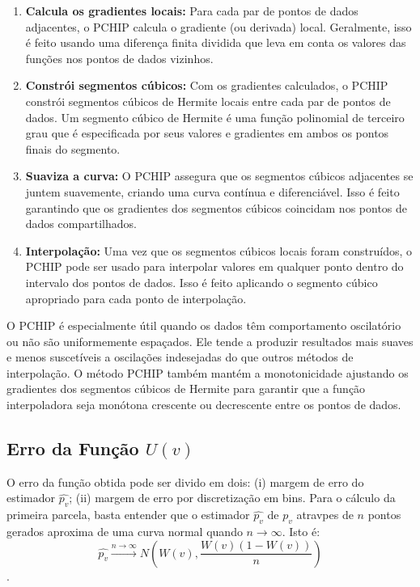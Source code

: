 \documentclass{article}
\begin{document}
\begin{enumerate}
    \item \textbf{Calcula os gradientes locais:} Para cada par de pontos de dados adjacentes, o PCHIP calcula o gradiente (ou derivada) local. Geralmente, isso é feito usando uma diferença finita dividida que leva em conta os valores das funções nos pontos de dados vizinhos.
    
    \item \textbf{Constrói segmentos cúbicos:} Com os gradientes calculados, o PCHIP constrói segmentos cúbicos de Hermite locais entre cada par de pontos de dados. Um segmento cúbico de Hermite é uma função polinomial de terceiro grau que é especificada por seus valores e gradientes em ambos os pontos finais do segmento.
    
    \item \textbf{Suaviza a curva:} O PCHIP assegura que os segmentos cúbicos adjacentes se juntem suavemente, criando uma curva contínua e diferenciável. Isso é feito garantindo que os gradientes dos segmentos cúbicos coincidam nos pontos de dados compartilhados.
    
    \item \textbf{Interpolação:} Uma vez que os segmentos cúbicos locais foram construídos, o PCHIP pode ser usado para interpolar valores em qualquer ponto dentro do intervalo dos pontos de dados. Isso é feito aplicando o segmento cúbico apropriado para cada ponto de interpolação.
\end{enumerate}

O PCHIP é especialmente útil quando os dados têm comportamento oscilatório ou não são uniformemente espaçados. Ele tende a produzir resultados mais suaves e menos suscetíveis a oscilações indesejadas do que outros métodos de interpolação. O método PCHIP também mantém a monotonicidade ajustando os gradientes dos segmentos cúbicos de Hermite para garantir que a função interpoladora seja monótona crescente ou decrescente entre os pontos de dados.

\subsection{Erro da Função $U(v)$}
O erro da função obtida pode ser divido em dois: (i) margem de erro do estimador $\hat{p_v}$; (ii) margem de erro por discretização em bins. Para o cálculo da primeira parcela, basta entender que o estimador $\hat{p_v}$ de $p_v$ atravpes de $n$ pontos gerados aproxima de uma curva normal quando $n \rightarrow \infty$. Isto é: $$\hat{p_v} \xrightarrow{n \rightarrow \infty} N\left(W(v), \frac{W(v)(1 - W(v))}{n}\right)$$.
\end{document}
